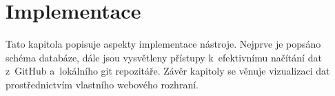 
\chapter{Implementace}
\label{chap:implementation}

Tato kapitola popisuje aspekty implementace nástroje. Nejprve je popsáno schéma databáze, dále jsou vysvětleny přístupy k~efektivnímu načítání dat z~GitHub \API a~lokálního git repozitáře. Závěr kapitoly se věnuje vizualizaci dat prostřednictvím vlastního webového rozhraní.



%



\endinput